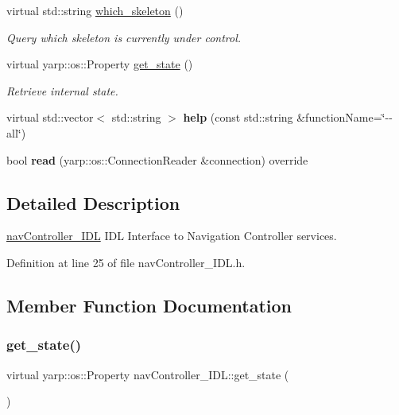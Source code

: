 \begin{DoxyCompactItemize}
virtual std\+::string \mbox{\hyperlink{classnavController__IDL_ae7a1cd7d5d35831bf7851a9cf15577c8}{which\+\_\+skeleton}} ()
\begin{DoxyCompactList}\small\item\em Query which skeleton is currently under control. \end{DoxyCompactList}\item 
virtual yarp\+::os\+::\+Property \mbox{\hyperlink{classnavController__IDL_a24e454dd1fa72ebcd6f18d4213487106}{get\+\_\+state}} ()
\begin{DoxyCompactList}\small\item\em Retrieve internal state. \end{DoxyCompactList}\item 
\mbox{\label{classnavController__IDL_ad653d3057cb43837b61939d92db9ac6e}} 
virtual std\+::vector$<$ std\+::string $>$ {\bfseries help} (const std\+::string \&function\+Name=\char`\"{}-\/-\/all\char`\"{})
\item 
\mbox{\label{classnavController__IDL_a332b70512a6e8a6a90b83077ee470558}} 
bool {\bfseries read} (yarp\+::os\+::\+Connection\+Reader \&connection) override
\end{DoxyCompactItemize}


\subsection{Detailed Description}
\mbox{\hyperlink{classnavController__IDL}{nav\+Controller\+\_\+\+I\+DL}} I\+DL Interface to Navigation Controller services. 

Definition at line 25 of file nav\+Controller\+\_\+\+I\+D\+L.\+h.



\subsection{Member Function Documentation}
\mbox{\label{classnavController__IDL_a24e454dd1fa72ebcd6f18d4213487106}} 
\subsubsection{\texorpdfstring{get\_state()}{get\_state()}}
{\footnotesize\ttfamily virtual yarp\+::os\+::\+Property nav\+Controller\+\_\+\+I\+D\+L\+::get\+\_\+state (\begin{DoxyParamCaption}{ }\end{DoxyParamCaption})\hspace{0.3cm}{\ttfamily [virtual]}}



